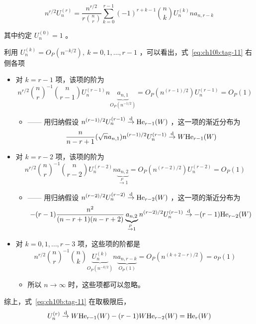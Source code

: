 \begin{example}
\begin{equation}
\label{eq:ch10b:tag-11}
n^{r/2}U_n^{(r)} = \frac{n^{r/2}}{r \binom{n}r} \sum_{k=0}^{r-1} (-1)^{r+k-1} \binom{n}k U_n^{(k)} na_{n,r-k}
\end{equation}

其中约定 $U_n^{(0)}=1$ 。

利用 $U_n^{(k)}=O_P(n^{-k/2}),\ k=0,1,\dots,r-1$ ，可以看出，式~\eqref{eq:ch10b:tag-11} 右侧各项

\begin{itemize}
\tightlist
\item
  对 $k=r-1$ 项，该项的阶为 
  $$n^{r/2}\binom nr^{-1}\binom n{r-1} U_n^{(r-1)}n\underbrace{a_{n,1}}_{O_P(n^{-1/2})}=O_P(n^{(r-1)/2})U_n^{(r-1)}=O_P(1)$$

\begin{itemize}
  \tightlist
  \item
    ------ 用归纳假设 $n^{(r-1)/2}U_n^{(r-1)}\overset{\rm d}\to \mathrm{He}_{r-1}(W)$ ，这一项的渐近分布为 
    $$\frac{n}{n-r+1}(\sqrt na_{n,1})n^{(r-1)/2}U_n^{(r-1)}\overset{\rm d}\to W\mathrm{He}_{r-1}(W)$$
  \end{itemize}
\item
  对 $k=r-2$ 项，该项的阶为 
  $$n^{r/2}\binom nr^{-1}\binom n{r-2}U_n^{(r-2)}n\underbrace{a_{n,2}}_{\overset{P}\to1}=O_P(n^{(r-2)/2})U_n^{(r-2)}=O_P(1)$$

\begin{itemize}
  \tightlist
  \item
    ------ 用归纳假设 $n^{(r-2)/2}U_n^{(r-2)}\overset{\rm d}\to \mathrm{He}_{r-2}(W)$ ，这一项的渐近分布为 
    $$-(r-1)\frac{n^2}{(n-r+1)(n-r+2)}\underbrace{a_{n,2}}_{\overset P\to 1}n^{(r-2)/2}U_n^{(r-1)}\overset{\rm d}\to -(r-1)\mathrm{He}_{r-2}(W)$$
  \end{itemize}
\item
  对 $k=0,1,\dots,r-3$ 项，这些项的阶都是 
  $$n^{r/2}\binom nr^{-1}\binom nk \underbrace{U_n^{(k)}}_{O_P(n^{-k/2})}n\underbrace{a_{n,r-k}}_{O_P(1)}=O_P(n^{(k+2-r)/2})=o_P(1)$$

\begin{itemize}
  \tightlist
  \item
    所以 $n\to\infty$ 时，这些项都可以忽略。
  \end{itemize}
\end{itemize}

综上，式~\eqref{eq:ch10b:tag-11} 在取极限后，
$$U_n^{(r)}\overset{\rm d}\to W\mathrm{He}_{r-1}(W)-(r-1)W\mathrm{He}_{r-2}(W)=\mathrm{He}_r(W)$$


\end{example}
